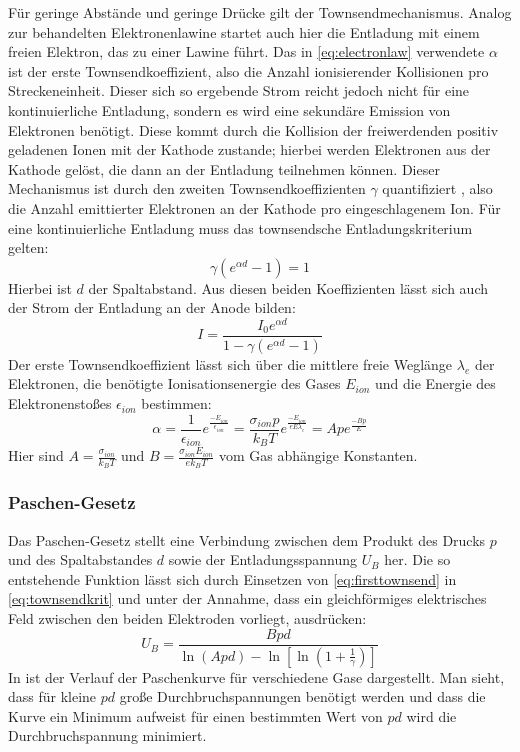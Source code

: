 Für geringe Abstände und geringe Drücke gilt der Townsendmechanismus. Analog zur behandelten Elektronenlawine startet auch hier die Entladung mit einem freien Elektron, das zu einer Lawine führt. Das in \eqref{eq:electronlaw} verwendete \(\alpha\) ist der erste Townsendkoeffizient, also die Anzahl ionisierender Kollisionen pro Streckeneinheit. Dieser sich so ergebende Strom reicht jedoch nicht für eine kontinuierliche Entladung, sondern es wird eine sekundäre Emission von Elektronen benötigt. Diese kommt durch die Kollision der freiwerdenden positiv geladenen Ionen mit der Kathode zustande; hierbei werden Elektronen aus der Kathode gelöst, die dann an der Entladung teilnehmen können. Dieser Mechanismus ist durch den zweiten Townsendkoeffizienten \(\gamma\) quantifiziert , also die Anzahl emittierter Elektronen an der Kathode pro eingeschlagenem Ion. Für eine kontinuierliche Entladung muss das townsendsche Entladungskriterium gelten:
\begin{equation}
    \gamma (e^{\alpha d}-1) = 1
    \label{eq:townsendkrit}
\end{equation}
Hierbei ist \(d\) der Spaltabstand. Aus diesen beiden Koeffizienten lässt sich auch der Strom der Entladung an der Anode bilden:
\begin{equation}
    I = \frac{I_0 e^{\alpha d}}{1-\gamma (e^{\alpha d} -1)}
\end{equation}
Der erste Townsendkoeffizient lässt sich über die mittlere freie Weglänge \(\lambda_e\) der Elektronen, die benötigte Ionisationsenergie des Gases \(E_{ion}\) und die Energie des Elektronenstoßes \(\epsilon_{ion}\) bestimmen:
\begin{equation}
    \alpha = \frac{1}{\epsilon_{ion}} e^{\frac{-E_{ion}}{\epsilon_{ion}}} 
    = \frac{\sigma_{ion}p}{k_B T} e^{\frac{-E_{ion}}{eE\lambda_e}} 
    = A p e^{\frac{-Bp}{E}}
    \label{eq:firsttownsend}
\end{equation}
Hier sind \(A = \frac{\sigma_{ion}}{k_B T}\) und \(B = \frac{\sigma_{ion} E_{ion}}{ek_B T}\) vom Gas abhängige Konstanten. \cite{fu2020}


\subsubsection{Paschen-Gesetz}
\label{sec:paschenlaw}
Das Paschen-Gesetz stellt eine Verbindung zwischen dem Produkt des Drucks \(p\) und des Spaltabstandes \(d\) sowie der Entladungsspannung \(U_B\) her. Die so entstehende Funktion lässt sich durch Einsetzen von \eqref{eq:firsttownsend} in \eqref{eq:townsendkrit} und unter der Annahme, dass ein gleichförmiges elektrisches Feld zwischen den beiden Elektroden vorliegt, ausdrücken:
\begin{equation}
    U_B = \frac{Bpd}{\ln\left( Apd \right) - \ln\left[ \ln\left(1 + \frac{1}{\gamma} \right) \right]}
    \label{eq:townsendbreak}
\end{equation}
In  ist der Verlauf der Paschenkurve für verschiedene Gase dargestellt. Man sieht, dass für kleine \(pd\) große Durchbruchspannungen benötigt werden und dass die Kurve ein Minimum aufweist für einen bestimmten Wert von \(pd\) wird die Durchbruchspannung minimiert.

